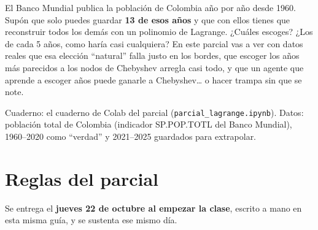 
\newcommand{\docpie}{Parcial 1 · Lagrange}

El Banco Mundial publica la población de Colombia año por año desde 1960. Supón que solo puedes guardar \textbf{13 de esos años} y que con ellos tienes que reconstruir todos los demás con un polinomio de Lagrange. ¿Cuáles escoges? ¿Los de cada 5 años, como haría casi cualquiera? En este parcial vas a ver con datos reales que esa elección ``natural'' falla justo en los bordes, que escoger los años más parecidos a los nodos de Chebyshev arregla casi todo, y que un agente que aprende a escoger años puede ganarle a Chebyshev\ldots{} o hacer trampa sin que se note.

Cuaderno: el cuaderno de Colab del parcial (\texttt{parcial\_lagrange.ipynb}). Datos: población total de Colombia (indicador SP.POP.TOTL del Banco Mundial), 1960--2020 como ``verdad'' y 2021--2025 guardados para extrapolar.

\section{Reglas del parcial}

Se entrega el \textbf{jueves 22 de octubre al empezar la clase}, escrito a mano en esta misma guía, y se sustenta ese mismo día.

